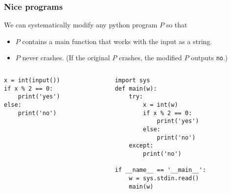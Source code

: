 \begin{frame}[fragile=true]
  \frametitle{Nice programs}

  {\small
    We can systematically modify any python program $P$ so that
  \begin{itemize}
  \item $P$ contains a main function that works with the input as a string.
  \item $P$ never crashes.  (If the original $P$ crashes, the modified
    $P$ outputs {\tt no}.)
  \end{itemize}
  }
  
  \begin{columns}
    \begin{column}{0.5\textwidth}
\begin{verbatim}
x = int(input())
if x % 2 == 0:
    print('yes')
else:
    print('no')
\end{verbatim}
    \end{column}
    \pause
    \begin{column}{0.5\textwidth}
      {\small
\begin{verbatim}
import sys
def main(w):
    try:
        x = int(w)
        if x % 2 == 0:
            print('yes')
        else:
            print('no')
    except:
        print('no')

if __name__ == '__main__':
    w = sys.stdin.read()
    main(w)
\end{verbatim}
}
    \end{column}
  \end{columns}

\end{frame}



